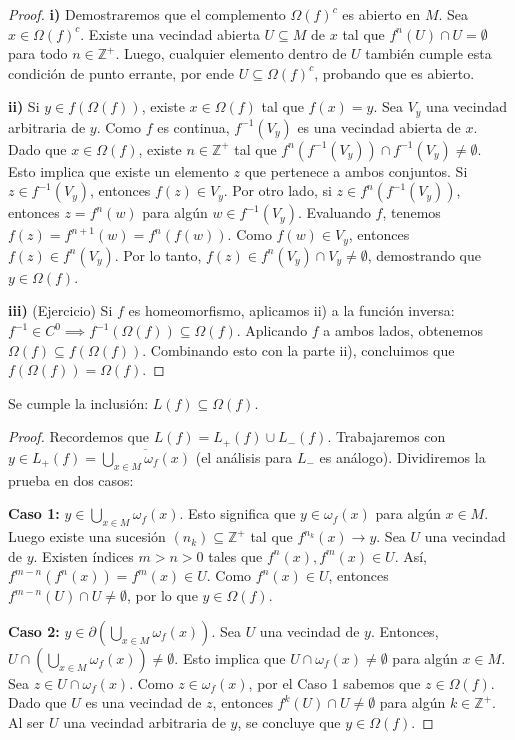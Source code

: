 \begin{proof}
	\textbf{i)} Demostraremos que el complemento $\Omega(f)^c$ es abierto en $M$. 
	Sea $x \in \Omega(f)^c$. Existe una vecindad abierta $U \subseteq M$ de $x$ tal que $f^n(U) \cap U = \emptyset$ para todo $n \in \mathbb{Z}^+$. Luego, cualquier elemento dentro de $U$ también cumple esta condición de punto errante, por ende $U \subseteq \Omega(f)^c$, probando que es abierto.
	
	\textbf{ii)} Si $y \in f(\Omega(f))$, existe $x \in \Omega(f)$ tal que $f(x) = y$. Sea $V_y$ una vecindad arbitraria de $y$. Como $f$ es continua, $f^{-1}(V_y)$ es una vecindad abierta de $x$.
	Dado que $x \in \Omega(f)$, existe $n \in \mathbb{Z}^+$ tal que $f^n(f^{-1}(V_y)) \cap f^{-1}(V_y) \neq \emptyset$.
	Esto implica que existe un elemento $z$ que pertenece a ambos conjuntos. Si $z \in f^{-1}(V_y)$, entonces $f(z) \in V_y$. Por otro lado, si $z \in f^n(f^{-1}(V_y))$, entonces $z = f^n(w)$ para algún $w \in f^{-1}(V_y)$. Evaluando $f$, tenemos $f(z) = f^{n+1}(w) = f^n(f(w))$. Como $f(w) \in V_y$, entonces $f(z) \in f^n(V_y)$.
	Por lo tanto, $f(z) \in f^n(V_y) \cap V_y \neq \emptyset$, demostrando que $y \in \Omega(f)$.
	
	\textbf{iii)} (Ejercicio) Si $f$ es homeomorfismo, aplicamos ii) a la función inversa: $f^{-1} \in C^0 \implies f^{-1}(\Omega(f)) \subseteq \Omega(f)$. Aplicando $f$ a ambos lados, obtenemos $\Omega(f) \subseteq f(\Omega(f))$. Combinando esto con la parte ii), concluimos que $f(\Omega(f)) = \Omega(f)$.
\end{proof}

\begin{proposicion}
	Se cumple la inclusión: $L(f) \subseteq \Omega(f)$.
\end{proposicion}

\begin{proof}
	Recordemos que $L(f) = L_+(f) \cup L_-(f)$. Trabajaremos con $y \in L_+(f) = \overline{\bigcup_{x \in M} \omega_f(x)}$ (el análisis para $L_-$ es análogo). Dividiremos la prueba en dos casos:
	
	\textbf{Caso 1:} $y \in \bigcup_{x \in M} \omega_f(x)$. Esto significa que $y \in \omega_f(x)$ para algún $x \in M$. Luego existe una sucesión $(n_k) \subseteq \mathbb{Z}^+$ tal que $f^{n_k}(x) \to y$. Sea $U$ una vecindad de $y$. Existen índices $m > n > 0$ tales que $f^n(x), f^m(x) \in U$.
	Así, $f^{m-n}(f^n(x)) = f^m(x) \in U$. Como $f^n(x) \in U$, entonces $f^{m-n}(U) \cap U \neq \emptyset$, por lo que $y \in \Omega(f)$.
	
	\textbf{Caso 2:} $y \in \partial\left(\bigcup_{x \in M} \omega_f(x)\right)$. Sea $U$ una vecindad de $y$. Entonces, $U \cap \left(\bigcup_{x \in M} \omega_f(x)\right) \neq \emptyset$.
	Esto implica que $U \cap \omega_f(x) \neq \emptyset$ para algún $x \in M$. Sea $z \in U \cap \omega_f(x)$. Como $z \in \omega_f(x)$, por el Caso 1 sabemos que $z \in \Omega(f)$. Dado que $U$ es una vecindad de $z$, entonces $f^k(U) \cap U \neq \emptyset$ para algún $k \in \mathbb{Z}^+$. Al ser $U$ una vecindad arbitraria de $y$, se concluye que $y \in \Omega(f)$.
\end{proof}


